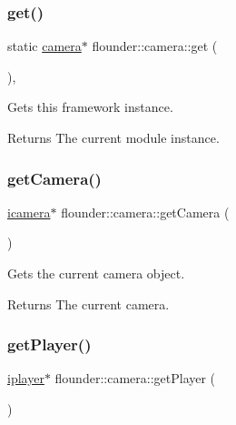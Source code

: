 \subsubsection{\texorpdfstring{get()}{get()}}
{\footnotesize\ttfamily static \hyperlink{classflounder_1_1camera}{camera}$\ast$ flounder\+::camera\+::get (\begin{DoxyParamCaption}{ }\end{DoxyParamCaption})\hspace{0.3cm}{\ttfamily [inline]}, {\ttfamily [static]}}



Gets this framework instance. 

\begin{DoxyReturn}{Returns}
The current module instance. 
\end{DoxyReturn}
\mbox{\label{classflounder_1_1camera_abc16dba0c44428f99ce65af2c1dac5b8}} 
\subsubsection{\texorpdfstring{get\+Camera()}{getCamera()}}
{\footnotesize\ttfamily \hyperlink{classflounder_1_1icamera}{icamera}$\ast$ flounder\+::camera\+::get\+Camera (\begin{DoxyParamCaption}{ }\end{DoxyParamCaption})\hspace{0.3cm}{\ttfamily [inline]}}



Gets the current camera object. 

\begin{DoxyReturn}{Returns}
The current camera. 
\end{DoxyReturn}
\mbox{\label{classflounder_1_1camera_a662d47759c3b570def49a75981b95bc4}} 
\subsubsection{\texorpdfstring{get\+Player()}{getPlayer()}}
{\footnotesize\ttfamily \hyperlink{classflounder_1_1iplayer}{iplayer}$\ast$ flounder\+::camera\+::get\+Player (\begin{DoxyParamCaption}{ }\end{DoxyParamCaption})\hspace{0.3cm}{\ttfamily [inline]}}



